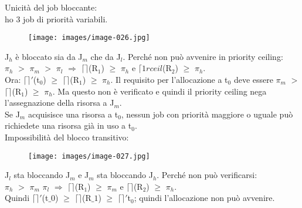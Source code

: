 \documentclass[12pt, oneside]{extbook}
\begin{document}
Unicità del job bloccante:\\ ho 3 job di priorità variabili.
\begin{figure}[!h]
\centering
\texttt{[image: images/image-026.jpg]}
\end{figure}
J$_{h}$ è bloccato sia da J$_{m}$ che da J$_{l}$. Perché non può avvenire in priority ceiling:\\ $\pi_{h}$ $>$ $\pi_{m}$ $>$ $\pi_{l}$ $\Rightarrow$ $\lceil\rceil$(R$_{1}$) $\geq$ $\pi_{h}$ e $\lceil1rceil$(R$_{2}$) $\geq$ $\pi_{h}$.\\ Ora: $\lceil\rceil'$(t$_{0}$) $\geq$ $\lceil\rceil$(R$_{1}$) $\geq$ $\pi_{h}$. Il requisito per l'allocazione a t$_{0}$ deve essere $\pi_{m}$ $>$ $\lceil\rceil$(R$_{1}$) $\geq$ $\pi_{h}$. Ma questo non è verificato e quindi il priority ceiling nega l'assegnazione della risorsa a J$_{m}$.\\ Se J$_{m}$ acquisisce una risorsa a t$_{0}$, nessun job con priorità maggiore o uguale può richiedete una risorsa già in uso a t$_{0}$.\\ Impossibilità del blocco transitivo:\\
\begin{figure}[!h]
\centering
\texttt{[image: images/image-027.jpg]}
\end{figure}
J$_{l}$ sta bloccando J$_{m}$ e J$_{m}$ sta bloccando J$_{h}$. Perché non può verificarsi:\\ $\pi_{h}$ $>$ $\pi_{m}$ $\pi_{l}$ $\Rightarrow$ $\lceil\rceil$(R$_{1}$) $\geq$ $\pi_{m}$ e $\lceil\rceil$(R$_{2}$) $\geq$ $\pi_{h}$.\\ Quindi $\lceil\rceil'$(t$\_{0}$) $\geq$ $\lceil\rceil$(R$\_{1}$) $\geq$ $\lceil\rceil'$t$_{0}$; quindi l'allocazione non può avvenire.\\
\end{document}
